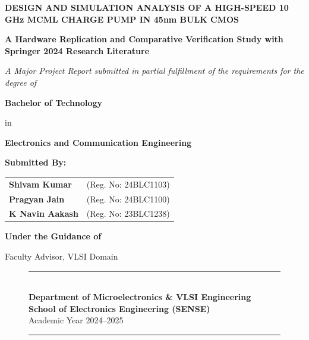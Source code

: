 \documentclass[11pt,a4paper]{report}
\begin{document}
\begin{titlepage}
    \centering
    \vspace*{0.5cm}
    
    {\Huge \bfseries \color{primaryblue} DESIGN AND SIMULATION ANALYSIS OF A HIGH-SPEED 10 GHz MCML CHARGE PUMP IN 45nm BULK CMOS \par}
    \vspace{0.4cm}
    {\LARGE \textbf{\color{secondarynavy}A Hardware Replication and Comparative Verification Study with Springer 2024 Research Literature} \par}
    
    \vspace{1.0cm}
    {\large \textit{A Major Project Report submitted in partial fulfillment of the requirements for the degree of}\par}
    \vspace{0.3cm}
    {\Large \textbf{Bachelor of Technology} \par}
    {\large in \par}
    {\Large \textbf{Electronics and Communication Engineering} \par}
    
    \vspace{1.2cm}
    {\large \textbf{Submitted By:}\par}
    \vspace{0.3cm}
    \begin{tabular}{ll}
        \textbf{Shivam Kumar} & (Reg. No: 24BLC1103) \\
        \textbf{Pragyan Jain} & (Reg. No: 24BLC1100) \\
        \textbf{K Navin Aakash} & (Reg. No: 23BLC1238) \\
    \end{tabular}
    
    \vspace{1.4cm}
    {\large \textbf{Under the Guidance of}\par}
    \vspace{0.2cm}
    {\large Faculty Advisor, VLSI Domain\par}
    
    \vspace{1.4cm}
    \begin{figure}[H]
        \centering
        \rule{0.65\textwidth}{1pt}\\[0.3cm]
        {\large \textbf{\color{secondarynavy}Department of Microelectronics \& VLSI Engineering}}\\[0.15cm]
        {\normalsize \textbf{School of Electronics Engineering (SENSE)}}\\[0.15cm]
        {\normalsize Academic Year 2024--2025}\\[0.2cm]
        \rule{0.65\textwidth}{1pt}
    \end{figure}
    
    \vfill
\end{titlepage}
\end{document}
